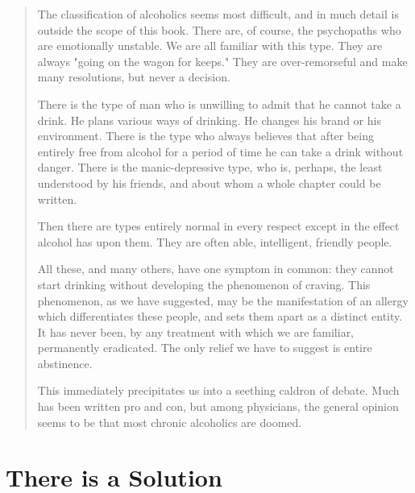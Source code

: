 \begin{quote}
The classification of alcoholics seems most difficult, and in much detail is outside the scope of this book. 
There are, of course, the psychopaths who are emotionally unstable. 
We are all familiar with this type. 
They are always "going on the wagon for keeps." 
They are over-remorseful and make many resolutions, but never a decision.

There is the type of man who is unwilling to admit that he cannot take a drink. 
He plans various ways of drinking. 
He changes his brand or his environment. 
There is the type who always believes that after being entirely free from alcohol for a period of time he can take a drink without danger. 
There is the manic-depressive type, who is, perhaps, the least understood by his friends, and about whom a whole chapter could be written.

Then there are types entirely normal in every respect except in the effect alcohol has upon them. 
They are often able, intelligent, friendly people.

All these, and many others, have one symptom in common: 
they cannot start drinking without developing the phenomenon of craving. 
This phenomenon, as we have suggested, may be the manifestation of an allergy which differentiates these people, and sets them apart as a distinct entity. 
It has never been, by any treatment with which we are familiar, permanently eradicated. 
The only relief we have to suggest is entire abstinence.

This immediately precipitates us into a seething caldron of debate. 
Much has been written pro and con, but among physicians, the general opinion seems to be that most chronic alcoholics are doomed.
\end{quote}


\section{There is a Solution}

